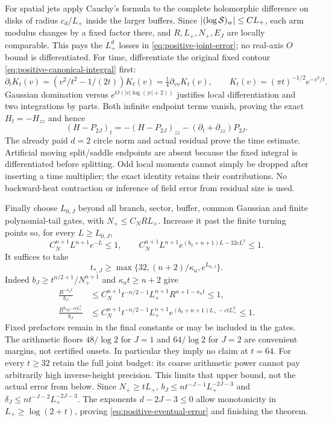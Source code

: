 For spatial jets apply Cauchy's formula to the complete holomorphic
difference on disks of radius $c_d/L_+$ inside the larger buffers.
Since $|(\log\mathcal S)_w|\le CL_+$, each arm modulus changes by a
fixed factor there, and $R,L_+,N_+,E_J$ are locally comparable.
This pays the $L_+^d$ losses in \eqref{eq:positive-joint-error};
no real-axis $O$ bound is differentiated. For time, differentiate the
original fixed contour \eqref{eq:positive-canonical-integral} first:
\[
 \partial_t K_t(v)=(v^2/t^2-1/(2t))K_t(v)
                  =\tfrac14\partial_{vv}K_t(v),\qquad
 K_t(v)=(\pi t)^{-1/2}e^{-v^2/t}.
\]
Gaussian domination versus $e^{O(|v|\log(|v|+2))}$ justifies local
differentiation and two integrations by parts. Both infinite endpoint
terms vanish, proving the exact $H_t=-H_{zz}$ and hence
\begin{equation}
 (H-P_{2J})_t=-(H-P_{2J})_{zz}
                         -(\partial_t+\partial_{zz})P_{2J}.
 \label{eq:positive-direct-time}
\end{equation}
The already paid $d=2$ circle norm and actual residual prove the time
estimate. Artificial moving split/saddle endpoints are absent because
the fixed integral is differentiated before splitting. Odd local
moments cannot simply be dropped after inserting a time multiplier;
the exact identity retains their contributions. No backward-heat
contraction or inference of field error from residual size is used.

Finally choose $L_{0,J}$ beyond all branch, sector, buffer, common
Gaussian and finite polynomial-tail gates, with $N_+\le C_NR L_+$.
Increase it past the finite turning points so, for every $L\ge L_{0,J}$,
\begin{equation}
 C_N^{n+1}L^{n+1}e^{-L}\le1,\qquad
 C_N^{n+1}L^{n+1}e^{(b_0+n+1)L-32cL^2}\le1.
 \label{eq:positive-onset-gates}
\end{equation}
It suffices to take
\begin{equation}
 t_{*,J}\ge\max\{32,(n+2)/\kappa_a,e^{L_{0,J}}\}.
 \label{eq:positive-symbolic-onset}
\end{equation}
Indeed $b_J\ge t^{n/2+1}/N_+^{n+1}$ and $\kappa_at\ge n+2$
give
\begin{align*}
 \frac{R^{-\kappa_at}}{b_J}
 &\le C_N^{n+1}t^{-n/2-1}L_+^{n+1}R^{n+1-\kappa_at}\le1,\\
 \frac{R^{b_0}e^{-ctL_+^2}}{b_J}
 &\le C_N^{n+1}t^{-n/2-1}L_+^{n+1}
           e^{(b_0+n+1)L_+-ctL_+^2}\le1.
\end{align*}
Fixed prefactors remain in the final constants or may be included in
the gates. The arithmetic floors $48/\log2$ for $J=1$ and
$64/\log2$ for $J=2$ are convenient margins, not certified onsets.
In particular they imply no claim at $t=64$. For every $t\ge32$
retain the full joint budget: its coarse arithmetic power cannot pay
arbitrarily high inverse-height precision. This limits that upper
bound, not the actual error from below. Since $N_+\ge tL_+$,
$b_J\le n t^{-J-1}L_+^{-2J-3}$ and
$\delta_J\le n t^{-J-2}L_+^{-2J-3}$. The exponents
$d-2J-3\le0$ allow monotonicity in $L_+\ge\log(2+t)$, proving
\eqref{eq:positive-eventual-error} and finishing the theorem.

